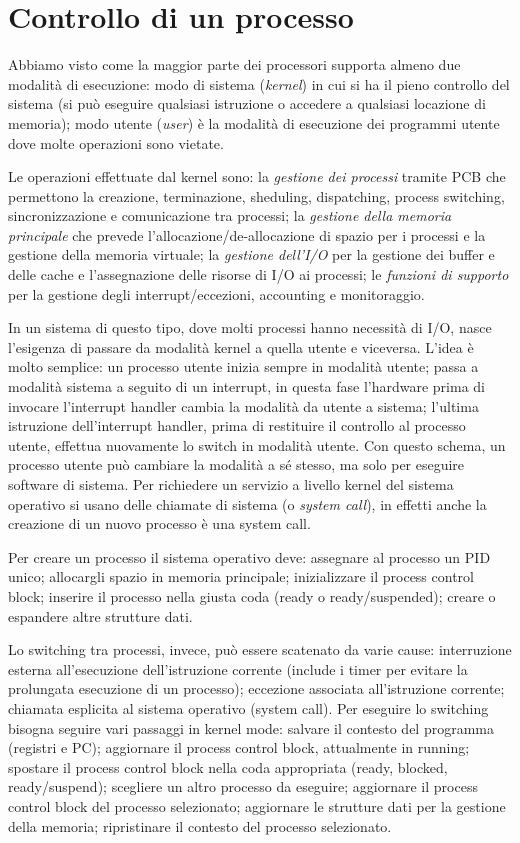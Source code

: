 \section{Controllo di un processo}
Abbiamo visto come la maggior parte dei processori supporta almeno due modalità di esecuzione: modo di sistema (\textit{kernel}) in cui si ha il pieno controllo del sistema (si può eseguire qualsiasi istruzione o accedere a qualsiasi locazione di memoria); modo utente (\textit{user}) è la modalità di esecuzione dei programmi utente dove molte operazioni sono vietate.

Le operazioni effettuate dal kernel sono: la \textit{gestione dei processi} tramite PCB che permettono la creazione, terminazione, sheduling, dispatching, process switching, sincronizzazione e comunicazione tra processi; la \textit{gestione della memoria principale} che prevede l'allocazione/de-allocazione di spazio per i processi e la gestione della memoria virtuale; la \textit{gestione dell'I/O} per la gestione dei buffer e delle cache e l'assegnazione delle risorse di I/O ai processi; le \textit{funzioni di supporto} per la gestione degli interrupt/eccezioni, accounting e monitoraggio.

In un sistema di questo tipo, dove molti processi hanno necessità di I/O, nasce l'esigenza di passare da modalità kernel a quella utente e viceversa. L'idea è molto semplice: un processo utente inizia sempre in modalità utente; passa a modalità sistema a seguito di un interrupt, in questa fase l'hardware prima di invocare l'interrupt handler cambia la modalità da utente a sistema; l'ultima istruzione dell'interrupt handler, prima di restituire il controllo al processo utente, effettua nuovamente lo switch in modalità utente. Con questo schema, un processo utente può cambiare la modalità a sé stesso, ma solo per eseguire software di sistema.
Per richiedere un servizio a livello kernel del sistema operativo si usano delle chiamate di sistema (o \textit{system call}), in effetti anche la creazione di un nuovo processo è una system call.

Per creare un processo il sistema operativo deve: assegnare al processo un PID unico; allocargli spazio in memoria principale; inizializzare il process control block; inserire il processo nella giusta coda (ready o ready/suspended); creare o espandere altre strutture dati.

Lo switching tra processi, invece, può essere scatenato da varie cause: interruzione esterna all'esecuzione dell'istruzione corrente (include i timer per evitare la prolungata esecuzione di un processo); eccezione associata all'istruzione corrente; chiamata esplicita al sistema operativo (system call). Per eseguire lo switching bisogna seguire vari passaggi in kernel mode: salvare il contesto del programma (registri e PC); aggiornare il process control block, attualmente in running; spostare il process control block nella coda appropriata (ready, blocked, ready/suspend); scegliere un altro processo da eseguire; aggiornare il process control block del processo selezionato; aggiornare le strutture dati per la gestione della memoria; ripristinare il contesto del processo selezionato.

